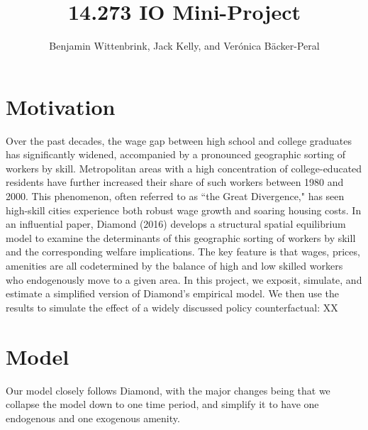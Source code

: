\documentclass{article}
\title{14.273 IO Mini-Project}
\author{Benjamin Wittenbrink, Jack Kelly, and Verónica Bäcker-Peral}
\begin{document}
\maketitle

\section{Motivation}


Over the past decades, the wage gap between high school and college graduates has significantly widened, accompanied by a pronounced geographic sorting of workers by skill. Metropolitan areas with a high concentration of college-educated residents have further increased their share of such workers between 1980 and 2000. This phenomenon, often referred to as ``the Great Divergence," has seen high-skill cities experience both robust wage growth and soaring housing costs. In an influential paper, Diamond (2016) develops a structural spatial equilibrium model to examine the determinants of this geographic sorting of workers by skill and the corresponding welfare implications. The key feature is that wages, prices, amenities are all codetermined by the balance of high and low skilled workers who endogenously move to a given area. In this project, we exposit, simulate, and estimate a simplified version of Diamond's empirical model. We then use the results to simulate the effect of a widely discussed policy counterfactual: XX

\section{Model}

Our model closely follows Diamond, with the major changes being that we collapse the model down to one time period, and simplify it to have one endogenous and one exogenous amenity. 
\end{document}
